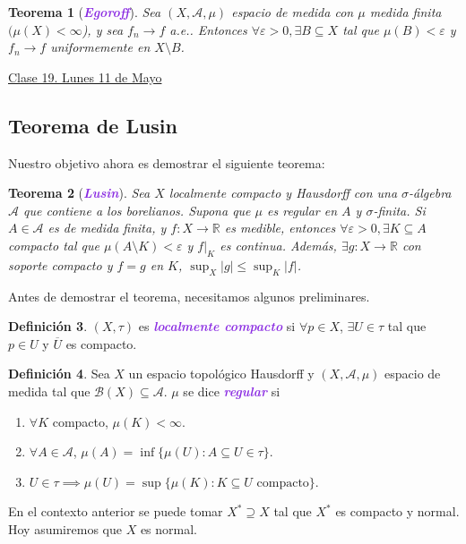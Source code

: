 \documentclass{article}
\newtheorem{theorem}{Teorema}[subsection]
\theoremstyle{definition}
\newtheorem{definition}[theorem]{Definición}
\theoremstyle{remark}
\numberwithin{equation}{section}
\newcommand{\B}{\mathcal{B}}
\newcommand{\R}{\mathbb{R}}
\newcommand{\Acal}{\mathcal{A}}
\newcommand{\e}{\varepsilon}
\renewcommand{\t}{\tau}
\newcommand{\oo}{\infty}
\renewcommand{\bar}{\overline}
\newcommand{\abs}[1]{\left| #1 \right|}
\newcommand{\olon}{\colon}
\newcommand{\wea}[1]{\textcolor{BlueViolet}{\textbf{\emph{#1}}}}
\newcommand{\fecha}[1]{\begin{flushright} \underline{#1} \end{flushright}}
\begin{document}
\begin{theorem}
  [\wea{Egoroff}]
  Sea $(X,\Acal,\mu)$ espacio de medida con $\mu$ medida finita $(\mu(X) < \oo$), y sea $f_n \to f$ a.e.. Entonces $\forall \e> 0,\exists B \subseteq X$ tal que $\mu(B) < \e$ y $f_n \to f$ uniformemente en $X \setminus B$.
\end{theorem}

\fecha{Clase 19. Lunes 11 de Mayo}

\subsection{Teorema de Lusin}
Nuestro objetivo ahora es demostrar el siguiente teorema:
\begin{theorem}
  [\wea{Lusin}]
  Sea $X$ localmente compacto y Hausdorff con una \( \sigma \)-álgebra $\Acal$ que contiene a los borelianos. Supona que $\mu$ es regular en $A$ y $\sigma$-finita. Si $A \in \Acal$ es de medida finita, y $f \olon X \to \R$ es medible, entonces $\forall \e>0,\exists K \subseteq A$ compacto tal que $\mu(A \setminus K) < \e$ y $f|_K$ es continua. Además, $\exists g \colon X \to \R$ con soporte compacto y $f=g$ en $K$, $\sup_X \abs g \leq \sup_K \abs f$.
\end{theorem}

Antes de demostrar el teorema, necesitamos algunos preliminares.

\begin{definition}
  $(X,\t)$ es \wea{localmente compacto} si $\forall p \in X$, $\exists U \in \t$ tal que $p \in U$ y $\bar U$ es compacto.
\end{definition}

\begin{definition}
  Sea $X$ un espacio topológico Hausdorff y $(X,\Acal,\mu)$ espacio de medida tal que $\B(X) \subseteq \Acal$. $\mu$ se dice \wea{regular} si 
  \begin{enumerate}[(1)]
    \item $\forall K$ compacto, $\mu(K) < \oo$.
    \item $\forall A \in \Acal$, $\mu(A) = \inf\{\mu(U) \colon A \subseteq U \in \t\}$.
    \item $U \in \t \implies \mu(U) = \sup\{\mu(K) \colon K \subseteq U \text{ compacto}\}$.
  \end{enumerate}
\end{definition}

En el contexto anterior se puede tomar $X^* \supseteq X$ tal que $X^*$ es compacto y normal. Hoy asumiremos que $X$ es normal.
\end{document}

